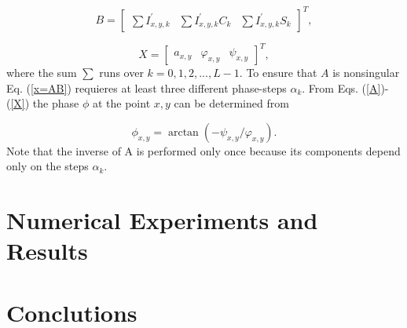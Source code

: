 \documentclass[letterpaper,12pt]{article}   %
\begin{document}
\begin{equation}\label{B}
B = \left[ \begin{array}{ccc}
\sum I_{x,y,k}^{'} & \sum I_{x,y,k}^{'} C_k & \sum I_{x,y,k}^{'} S_k \end{array} \right]^T,
\end{equation}

\begin{equation}\label{X}
X = \left[ \begin{array}{ccc}
a_{x,y} & \varphi_{x,y} & \psi_{x,y} \end{array} \right]^T,
\end{equation}
where the sum $\sum$ runs over $k=0,1,2,...,L-1$. To ensure that $A$ is nonsingular Eq. (\ref{x=AB}) requieres at least three different phase-steps $\alpha_k$.
From Eqs. (\ref{A})-(\ref{X}) the phase $\phi$ at the point $x,y$ can be determined from

\begin{equation}
\phi_{x,y} = \arctan(-\psi_{x,y}/\varphi_{x,y}).
\end{equation}
Note that the inverse of A is performed only once because its components depend only on the steps $\alpha_k$.





\section{Numerical Experiments and Results}
\section{Conclutions}



\end{document}
